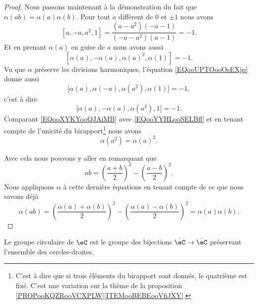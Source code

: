 \begin{proof}
    Nous passons maintenant à la démonstration du fait que \( \alpha(ab)=\alpha(a)\alpha(b)\). Pour tout \( a\) différent de \( 0\) et \( \pm 1\) nous avons
    \begin{equation}        \label{EQooUPTOooOsEXjp}
        [a,-a,a^2,1]=\frac{ (a-a^2)(-a-1) }{ (-a-a^2)(a-1) }=-1.
    \end{equation}
    Et en prenant \( \alpha(a)\) en guise de \( a\) nous avons aussi
    \begin{equation}        \label{EQooXYKYooQJAiMB}
        [\alpha(a),-\alpha(a),\alpha(a)^2,\alpha(1)]=-1.
    \end{equation}
    Vu que \( \alpha\) préserve les divisions harmoniques, l'équation \eqref{EQooUPTOooOsEXjp} donne aussi
    \begin{equation}
        \big[ \alpha(a),\alpha(-a),\alpha(a^2),\alpha(1) \big]=-1,
    \end{equation}
    c'est à dire
    \begin{equation}    \label{EQooYYHLooSELBfl}
        \big[ \alpha(a),-\alpha(a),\alpha(a^2),1 \big]=-1.
    \end{equation}
    Comparant \eqref{EQooXYKYooQJAiMB} avec \eqref{EQooYYHLooSELBfl} et en tenant compte de l'unicité du birapport\footnote{C'est à dire que si trois éléments du birapport sont donnés, le quatrième est fixé. C'est une variation sur la thème de la proposition \ref{PROPooKQZRooVCXPLW}\ref{ITEMooBEBEooVfiJXY}.} nous avons 
    \begin{equation}
        \alpha(a^2)=\alpha(a)^2.
    \end{equation}
    
    Avec cela nous pouvons y aller en remarquant que
    \begin{equation}
        ab=\left( \frac{ a+b }{2} \right)^2-\left( \frac{ a-b }{2} \right)^2.
    \end{equation}
    Nous appliquons \( \alpha\) à cette dernière équations en tenant compte de ce que nous savons déjà
    \begin{equation}
        \alpha(ab)=\left( \frac{ \alpha(a)+\alpha(b) }{2} \right)^2-\left( \frac{ \alpha(a)-\alpha(b) }{2} \right)^2=\alpha(a)\alpha(b).
    \end{equation}
\end{proof}

\begin{theorem}       \label{THOooKMKWooZPIDaK}
    Le groupe circulaire de \( \eC\) est le groupe des bijections \( \hat\eC\to\hat \eC\) préservant l'ensemble des cercles-droites.
\end{theorem}

